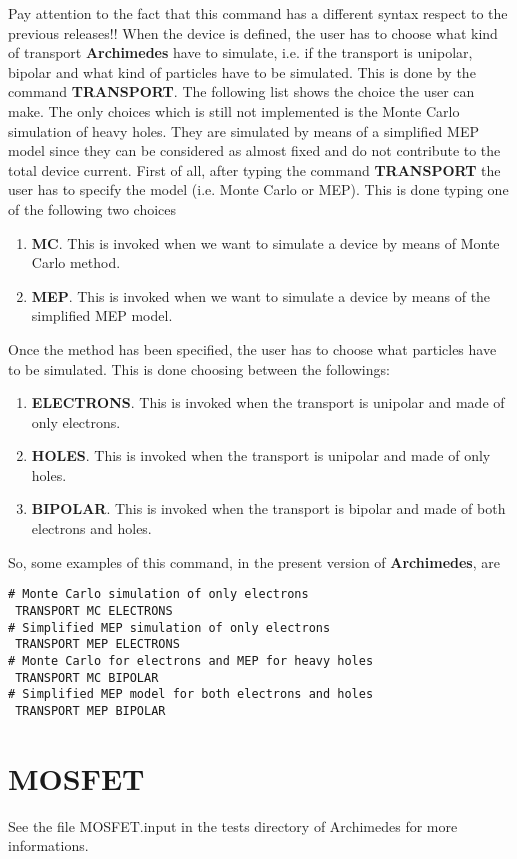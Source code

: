 \documentclass[12pt]{book}
\begin{document}
Pay attention to the fact that this command has a different syntax respect to the previous releases!!
When the device is defined, the user has to choose what kind of transport \textbf{Archimedes} have to simulate, i.e. if the transport is unipolar, bipolar and what kind of particles have to be simulated. This is done by the command \textbf{TRANSPORT}. The following list shows the choice the user can make. The only choices which is still not implemented is the Monte Carlo simulation of heavy holes. They are simulated by means of a simplified MEP model since they can be considered as almost fixed and do not contribute to the total device current.
First of all, after typing the command \textbf{TRANSPORT} the user has to specify the model (i.e. Monte Carlo or MEP). This is done typing one of the following two choices
\begin{enumerate}
\item
\textbf{MC}. This is invoked when we want to simulate a device by means of Monte Carlo method.
\item
\textbf{MEP}. This is invoked when we want to simulate a device by means of the simplified MEP model.
\end{enumerate}
Once the method has been specified, the user has to choose what particles have to be simulated. This is done choosing between the followings:
\begin{enumerate}
\item
\textbf{ELECTRONS}. This is invoked when the transport is unipolar and made of only electrons.
\item
\textbf{HOLES}. This is invoked when the transport is unipolar and made of only holes.
\item
\textbf{BIPOLAR}. This is invoked when the transport is bipolar and made of both electrons and holes.
\end{enumerate}
So, some examples of this command, in the present version of \textbf{Archimedes}, are
\begin{verbatim}
# Monte Carlo simulation of only electrons
 TRANSPORT MC ELECTRONS
# Simplified MEP simulation of only electrons
 TRANSPORT MEP ELECTRONS
# Monte Carlo for electrons and MEP for heavy holes
 TRANSPORT MC BIPOLAR
# Simplified MEP model for both electrons and holes
 TRANSPORT MEP BIPOLAR
\end{verbatim}

\section{MOSFET}
See the file MOSFET.input in the tests directory of Archimedes for more informations.
\end{document}
